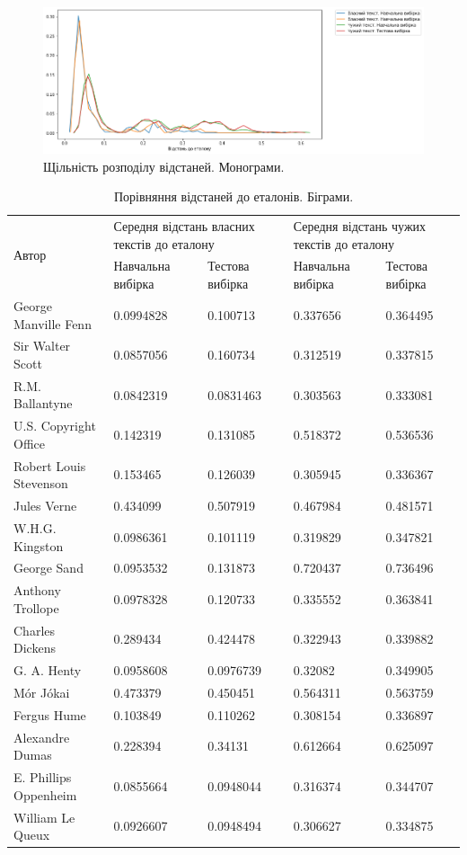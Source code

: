 \documentclass[12pt, a4paper]{extarticle}
\begin{document}
\begin{figure}
\includegraphics[width=\linewidth]{figures/1.png}
\centering
\caption{Щільність розподілу відстаней. Монограми.}
\label{fig:1}
\end{figure}

\begin{center}
\begin{table}
\begin{tabular}{|p{11em}|p{5em}|p{5em}|p{5em}|p{5em}|}
\hline
\multirow{2}{4em}{Автор} & \multicolumn{2}{|p{10em}|}{Середня відстань власних текстів до еталону} & \multicolumn{2}{|p{10em}|}{Середня відстань чужих текстів до еталону} \\
\cline{2-5}
& Навчальна вибірка & Тестова вибірка & Навчальна вибірка & Тестова вибірка\\
\hline
George Manville Fenn & 0.0994828 & 0.100713 & 0.337656 & 0.364495\\
Sir Walter Scott & 0.0857056 & 0.160734 & 0.312519 & 0.337815\\
R.M. Ballantyne & 0.0842319 & 0.0831463 & 0.303563 & 0.333081\\
U.S. Copyright Office & 0.142319 & 0.131085 & 0.518372 & 0.536536\\
Robert Louis Stevenson & 0.153465 & 0.126039 & 0.305945 & 0.336367\\
Jules Verne & 0.434099 & 0.507919 & 0.467984 & 0.481571\\
W.H.G. Kingston & 0.0986361 & 0.101119 & 0.319829 & 0.347821\\
George Sand & 0.0953532 & 0.131873 & 0.720437 & 0.736496\\
Anthony Trollope & 0.0978328 & 0.120733 & 0.335552 & 0.363841\\
Charles Dickens & 0.289434 & 0.424478 & 0.322943 & 0.339882\\
G. A. Henty & 0.0958608 & 0.0976739 & 0.32082 & 0.349905\\
Mór Jókai & 0.473379 & 0.450451 & 0.564311 & 0.563759\\
Fergus Hume & 0.103849 & 0.110262 & 0.308154 & 0.336897\\
Alexandre Dumas & 0.228394 & 0.34131 & 0.612664 & 0.625097\\
E. Phillips Oppenheim & 0.0855664 & 0.0948044 & 0.316374 & 0.344707\\
William Le Queux & 0.0926607 & 0.0948494 & 0.306627 & 0.334875\\
\hline
\end{tabular}
\caption{Порівняння відстаней до еталонів. Біграми.}
\label{tab:2}
\end{table}
\end{center}
\end{document}
